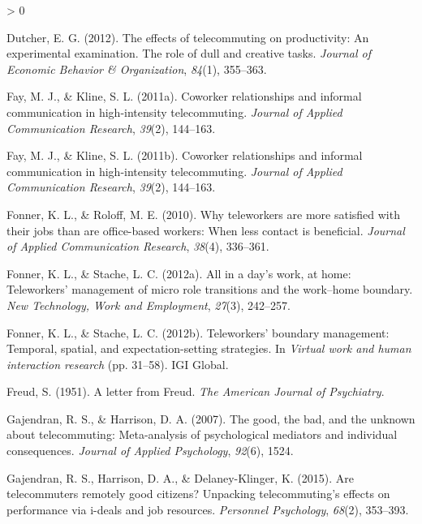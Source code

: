 \documentclass[
  english,
  man]{apa6}
\newlength{\cslhangindent}
\newenvironment{CSLReferences}[2] %
 {%
  \setlength{\parindent}{0pt}
  \ifodd #1 \everypar{\setlength{\hangindent}{\cslhangindent}}\ignorespaces\fi
  \ifnum #2 > 0
  \setlength{\parskip}{#2\baselineskip}
  \fi
 }%
 {}
\begin{document}
\begin{CSLReferences}{1}{0}
\leavevmode\hypertarget{ref-dutcher_effects_2012}{}%
Dutcher, E. G. (2012). The effects of telecommuting on productivity: An experimental examination. The role of dull and creative tasks. \emph{Journal of Economic Behavior \& Organization}, \emph{84}(1), 355--363.

\leavevmode\hypertarget{ref-fay_coworker_2011}{}%
Fay, M. J., \& Kline, S. L. (2011a). Coworker relationships and informal communication in high-intensity telecommuting. \emph{Journal of Applied Communication Research}, \emph{39}(2), 144--163.

\leavevmode\hypertarget{ref-fay_coworker_2011-1}{}%
Fay, M. J., \& Kline, S. L. (2011b). Coworker relationships and informal communication in high-intensity telecommuting. \emph{Journal of Applied Communication Research}, \emph{39}(2), 144--163.

\leavevmode\hypertarget{ref-fonner_why_2010}{}%
Fonner, K. L., \& Roloff, M. E. (2010). Why teleworkers are more satisfied with their jobs than are office-based workers: When less contact is beneficial. \emph{Journal of Applied Communication Research}, \emph{38}(4), 336--361.

\leavevmode\hypertarget{ref-fonner_all_2012}{}%
Fonner, K. L., \& Stache, L. C. (2012a). All in a day's work, at home: Teleworkers' management of micro role transitions and the work--home boundary. \emph{New Technology, Work and Employment}, \emph{27}(3), 242--257.

\leavevmode\hypertarget{ref-fonner_teleworkers_2012}{}%
Fonner, K. L., \& Stache, L. C. (2012b). Teleworkers' boundary management: Temporal, spatial, and expectation-setting strategies. In \emph{Virtual work and human interaction research} (pp. 31--58). {IGI} Global.

\leavevmode\hypertarget{ref-freud_letter_1951}{}%
Freud, S. (1951). A letter from {Freud}. \emph{The American Journal of Psychiatry}.

\leavevmode\hypertarget{ref-gajendran_good_2007}{}%
Gajendran, R. S., \& Harrison, D. A. (2007). The good, the bad, and the unknown about telecommuting: Meta-analysis of psychological mediators and individual consequences. \emph{Journal of Applied Psychology}, \emph{92}(6), 1524.

\leavevmode\hypertarget{ref-gajendran_are_2015}{}%
Gajendran, R. S., Harrison, D. A., \& Delaney-Klinger, K. (2015). Are telecommuters remotely good citizens? Unpacking telecommuting's effects on performance via i-deals and job resources. \emph{Personnel Psychology}, \emph{68}(2), 353--393.


\end{CSLReferences}
\end{document}
